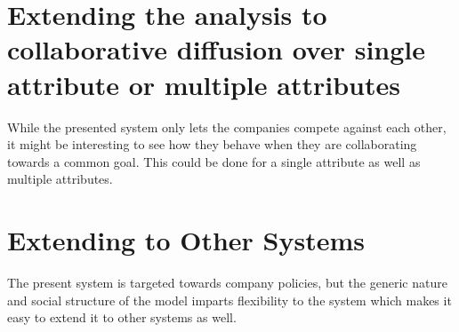 \section{Extending the analysis to collaborative diffusion over single attribute or multiple attributes}

While the presented system only lets the companies compete against each other, it might be interesting to see how they behave when they are collaborating towards a common goal. This could be done for a single attribute as well as multiple attributes. 

\section{Extending to Other Systems}

The present system is targeted towards company policies, but the generic nature and social structure of the model imparts flexibility to the system which makes it easy to extend it to other systems as well.
